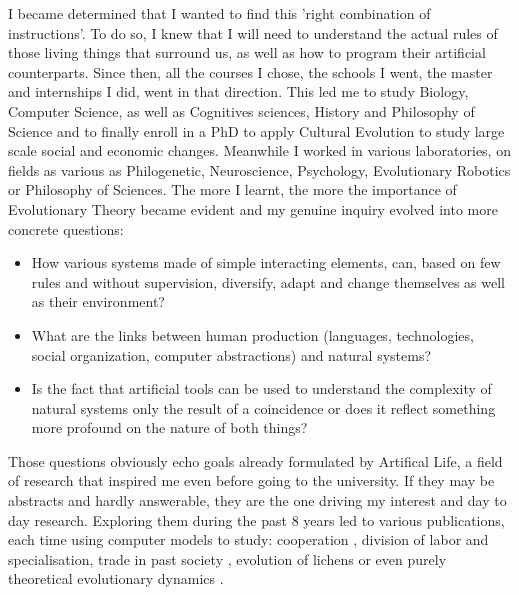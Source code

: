 \documentclass[10pt]{article}
\begin{document}
I became determined that I wanted to find this 'right combination of instructions'. To do so, I knew that I will need to understand the actual rules of those living things that surround us, as well as how to program their artificial counterparts.  Since then, all the courses I chose, the schools I went, the master and internships I did, went in that direction. This led me to study Biology, Computer Science, as well as Cognitives sciences, History and Philosophy of Science and to finally enroll in a PhD to apply Cultural Evolution to study large scale social and economic changes. Meanwhile I worked  in various laboratories, on fields as various as Philogenetic, Neuroscience, Psychology, Evolutionary Robotics or Philosophy of Sciences. The more I learnt, the more the importance of Evolutionary Theory became evident and my genuine inquiry evolved into more concrete questions: 
\begin{itemize}
    \item How various systems made of simple interacting elements, can, based on few rules and without supervision, diversify, adapt and change themselves as well as their environment?
    \item What are the links between human production (languages, technologies, social organization, computer abstractions) and natural systems? 
    \item Is the fact that artificial tools can be used to understand the complexity of natural systems only the result of a coincidence or does it reflect something more profound on the nature of both things?
\end{itemize}
Those questions obviously echo goals already formulated by  Artifical Life, a field of research that inspired me even before going to the university. If they may be abstracts and hardly answerable, they are the one driving my interest and day to day research. 
Exploring them during the past 8 years led to various publications, each time using computer models to study: cooperation \cite{zibetti2015acaciaesanagentbasedmodelingandsimulationtoolforinvestigatingsocialbehaviorsinresourcelimitedtwodimensionalenvironments}, division of labor and specialisation\cite{montanier2016behavioralspecializationinembodiedevolutionaryroboticswhysodifficult,bredeche2017benefitsofproportionateselectioninembodiedevolutionacasestudywithbehaviouralspecialization}, trade in past society \cite{carrignon2015modelingthecoevolutionoftradeandcultureinpastsocieties}, evolution of lichens \cite{carrignon2016lichen} or even purely theoretical evolutionary dynamics \cite{medernach2015evolutionary,medernach2016evolution}.
\end{document}
